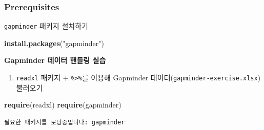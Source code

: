 \documentclass[
  11pt,
]{krantz}
\makeatletter
\newenvironment{Shaded}{\begin{snugshade}}{\end{snugshade}}
\newcommand{\KeywordTok}[1]{\textcolor[rgb]{0.27,0.27,0.27}{\textbf{#1}}}
\newcommand{\NormalTok}[1]{#1}
\newcommand{\StringTok}[1]{\textcolor[rgb]{0.5,0.5,0.5}{#1}}
\providecommand{\tightlist}{%
  \setlength{\itemsep}{0pt}\setlength{\parskip}{0pt}}
\newenvironment{kframe}{%
\medskip{}
\setlength{\fboxsep}{.8em}
 \def\at@end@of@kframe{}%
 \ifinner\ifhmode%
  \def\at@end@of@kframe{\end{minipage}}%
  \begin{minipage}{\columnwidth}%
 \fi\fi%
 \def\FrameCommand##1{\hskip\@totalleftmargin \hskip-\fboxsep
 \colorbox{shadecolor}{##1}\hskip-\fboxsep
     \hskip-\linewidth \hskip-\@totalleftmargin \hskip\columnwidth}%
 \MakeFramed {\advance\hsize-\width
   \@totalleftmargin\z@ \linewidth\hsize
   \@setminipage}}%
 {\par\unskip\endMakeFramed%
 \at@end@of@kframe}
\newenvironment{rmdblock}[1]
  {
  \begin{itemize}
  \renewcommand{\labelitemi}{
    \raisebox{-.7\height}[0pt][0pt]{
      {\setkeys{Gin}{width=3em,keepaspectratio}\texttt{[image: images/\#1]}}
    }
  }
  \setlength{\fboxsep}{1em}
  \begin{kframe}
  \item
  }
  {
  \end{kframe}
  \end{itemize}
  }
\newenvironment{rmdimportant}
  {\begin{rmdblock}{important}}
  {\end{rmdblock}}
\renewenvironment{quote}{\begin{kframe}}{\end{kframe}}
\makeatother
\begin{document}
\normalsize

\hypertarget{ex-pre}{%
\subsubsection*{Prerequisites}\label{ex-pre}}


\begin{quote}
\texttt{gapminder} 패키지 설치하기
\end{quote}

\footnotesize

\begin{Shaded}
\begin{Highlighting}[]
\KeywordTok{install.packages}\NormalTok{(}\StringTok{"gapminder"}\NormalTok{)}
\end{Highlighting}
\end{Shaded}

\normalsize

\footnotesize

\begin{rmdimportant}
\begin{rmdimportant}

\textbf{Gapminder 데이터 핸들링 실습}

\end{rmdimportant}
\end{rmdimportant}

\normalsize

\begin{enumerate}
\def\labelenumi{\arabic{enumi}.}
\tightlist
\item
  \texttt{readxl} 패키지 + \texttt{\%\textgreater{}\%}를 이용해 Gapminder 데이터(\texttt{gapminder-exercise.xlsx}) 불러오기
\end{enumerate}

\footnotesize

\begin{Shaded}
\begin{Highlighting}[]
\KeywordTok{require}\NormalTok{(readxl)}
\KeywordTok{require}\NormalTok{(gapminder)}
\end{Highlighting}
\end{Shaded}

\begin{verbatim}
필요한 패키지를 로딩중입니다: gapminder
\end{verbatim}
\end{document}
